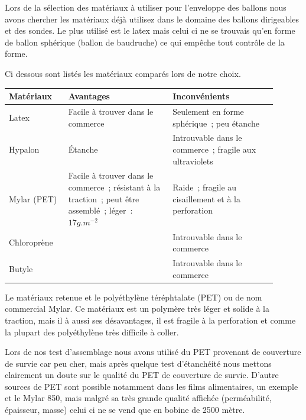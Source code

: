 \documentclass[a4paper,11pt]{article}
\begin{document}
Lors de la sélection des matériaux à utiliser pour l'enveloppe des ballons nous avons chercher les matériaux déjà utilisez dans le domaine des ballons dirigeables et des sondes. Le plus utilisé est le latex mais celui ci ne se trouvais qu'en forme de ballon sphérique (ballon de baudruche) ce qui empêche tout contrôle de la forme.

Ci dessous sont listés les matériaux comparés lors de notre choix.

\begin{center}
\begin{tabular}{|p{0.2\linewidth}|p{0.35\linewidth}|p{0.35\linewidth}|}
		\hline
		Matériaux & Avantages & Inconvénients \\
		\hline

		\rowcolor{OrangeT}
		Latex &
		Facile à trouver dans le commerce &
		Seulement en forme sphérique~; peu étanche \\
		\hline

		\rowcolor{RedT}
		Hypalon & Étanche & Introuvable dans le commerce~; fragile aux ultraviolets \\
		\hline

		\rowcolor{GreenT}
		Mylar (PET) &
		Facile à trouver dans le commerce~; résistant à la traction~; peut être assemblé~; léger~: $17 g.m^{-2}$ &
		Raide~; fragile au cisaillement et à la perforation \\
		\hline

		\rowcolor{RedT}
		Chloroprène &
		& Introuvable dans le commerce \\
		\hline

		\rowcolor{RedT}
		Butyle &
		& Introuvable dans le commerce \\
		\hline
\end{tabular}
\end{center}

Le matériaux retenue et le polyéthylène téréphtalate (PET) ou de nom commercial Mylar. Ce matériaux est un polymère très léger et solide à la traction, mais il à aussi ses désavantages, il est fragile à la perforation et comme la plupart des polyéthylène très difficile à coller.

Lors de nos test d'assemblage nous avons utilisé du PET provenant de couverture de survie car peu cher, mais après quelque test d'étanchéité nous mettons clairement un doute sur le qualité du PET de couverture de survie. D'autre sources de PET sont possible notamment dans les films alimentaires, un exemple et le Mylar 850, mais malgré sa très grande qualité affichée (perméabilité, épaisseur, masse) celui ci ne se vend que en bobine de 2500 mètre.
\end{document}
